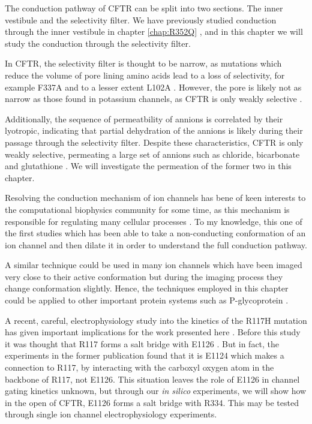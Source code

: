 The conduction pathway of CFTR can be split into two sections. The inner vestibule and the selectivity filter. We have previously studied conduction through the inner vestibule in chapter \ref{chap:R352Q} \cite{wong2022a}, and in this chapter we will study the conduction through the selectivity filter. 

In CFTR, the selectivity filter is thought to be narrow, as mutations which reduce the volume of pore lining amino acids lead to a loss of selectivity, for example F337A and to a lesser extent L102A \cite{}. However, the pore is likely not as narrow as those found in potassium channels, as CFTR is only weakly selective \cite{}. 

Additionally, the sequence of permeatbility of annions is correlated by their lyotropic, indicating that partial dehydration of the annions is likely during their passage through the selectivity filter. Despite these characteristics, CFTR is only weakly selective, permeating a large set of annions such as chloride, bicarbonate and glutathione \cite{}. We will investigate the permeation of the former two in this chapter. 

Resolving the conduction mechanism of ion channels has bene of keen interests to the computational biophysics community for some time, as this mechanism is responsible for regulating many cellular processes \cite{black2020}. To my knowledge, this one of the first studies which has been able to take a non-conducting conformation of an ion channel and then dilate it in order to understand the full conduction pathway. 

A similar technique could be used in many ion channels which have been imaged very close to their active conformation but during the imaging process they change conformation slightly. Hence, the techniques employed in this chapter could be applied to other important protein systems such as P-glycoprotein \cite{}.  %

A recent, careful, electrophysiology study into the kinetics of the R117H mutation has given important implications for the work presented here \cite{}. Before this study it was thought that R117 forms a salt bridge with E1126 \cite{cui2014}. But in fact, the experiments in the former publication found that it is E1124 which makes a connection to R117, by interacting with the carboxyl oxygen atom in the backbone of R117, not E1126. This situation leaves the role of E1126 in channel gating kinetics unknown, but through our \textit{in silico} experiments, we will show how in the open of CFTR, E1126 forms a salt bridge with R334. This may be tested through single ion channel electrophysiology experiments.

